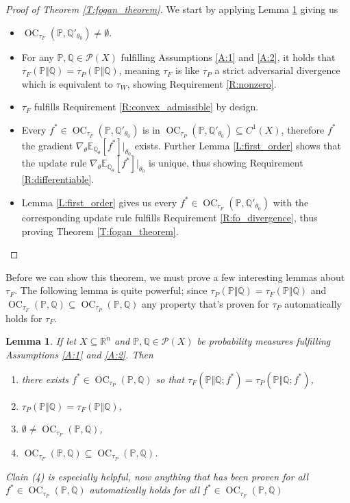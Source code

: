 \documentclass{article}
\DeclareMathOperator{\oc}{OC}
\newtheorem{lemma}{Lemma}
\begin{document}
 \begin{proof}[Proof of Theorem \ref{T:fogan_theorem}]
 We start by applying Lemma \ref{L:adversary_subset} giving us
 \begin{itemize}
  \item $\oc_{\tau_F}(\mathbb P,\mathbb Q'_{\theta_0})\not=\emptyset$.
  \item For any $\mathbb P,\mathbb Q\in\mathcal P(X)$ fulfilling Assumptions \ref{A:1} and \ref{A:2}, it holds that
  $\tau_F(\mathbb P\Vert\mathbb Q)=\tau_P(\mathbb P\Vert\mathbb Q)$, meaning $\tau_F$ is like $\tau_P$ a strict adversarial divergence
  which is equivalent to $\tau_W$, showing Requirement \ref{R:nonzero}.
  \item $\tau_F$ fulfills Requirement \ref{R:convex_admissible} by design.
  \item Every $f^*\in\oc_{\tau_F}(\mathbb P,\mathbb Q'_{\theta_0})$ is in $\oc_{\tau_P}(\mathbb P,\mathbb Q'_{\theta_0})\subseteq C^1(X)$,
  therefore $f^*$ the gradient $\nabla_\theta\mathbb E_{\mathbb Q_\theta}[f^*]|_{\theta_0}$ exists. Further Lemma \ref{L:first_order}
  shows that the update rule $\nabla_\theta\mathbb E_{\mathbb Q_\theta}[f^*]|_{\theta_0}$ is unique, thus showing Requirement \ref{R:differentiable}.
  \item Lemma \ref{L:first_order} gives us
 every $f^*\in\oc_{\tau_F}(\mathbb P,\mathbb Q'_{\theta_0})$ with the corresponding update rule fulfills Requirement \ref{R:fo_divergence}, thus proving Theorem \ref{T:fogan_theorem}.
 \end{itemize}
 \end{proof}

 Before we can show this theorem, we must prove a few interesting lemmas about $\tau_F$. The following lemma is quite powerful;
 since $\tau_P(\mathbb P\Vert\mathbb Q)=\tau_F(\mathbb P\Vert\mathbb Q)$ and $\oc_{\tau_F}(\mathbb P,\mathbb Q)\subseteq \oc_{\tau_P}(\mathbb P,\mathbb Q)$
 any property that's proven for $\tau_P$ automatically holds for $\tau_F$.

 \begin{lemma}\label{L:adversary_subset}
If let $X\subseteq\mathbb R^n$ and $\mathbb P,\mathbb Q\in \mathcal P(X)$ be probability measures fulfilling Assumptions \ref{A:1} and \ref{A:2}. Then
\begin{enumerate}
 \item there exists $f^*\in\oc_{\tau_P}(\mathbb P,\mathbb Q)$ so that $\tau_F(\mathbb P\Vert\mathbb Q;f^*)=\tau_P(\mathbb P\Vert\mathbb Q;f^*)$,
 \item $\tau_P(\mathbb P\Vert\mathbb Q)=\tau_F(\mathbb P\Vert\mathbb Q)$,
 \item $\emptyset\not=\oc_{\tau_F}(\mathbb P,\mathbb Q)$,
 \item $\oc_{\tau_F}(\mathbb P,\mathbb Q)\subseteq \oc_{\tau_P}(\mathbb P,\mathbb Q)$.
\end{enumerate}
Clain (4) is especially helpful, now anything that has been proven for all $f^*\in\oc_{\tau_P}(\mathbb P,\mathbb Q)$
automatically holds for all $f^*\in\oc_{\tau_F}(\mathbb P,\mathbb Q)$
\end{lemma}
\end{document}
